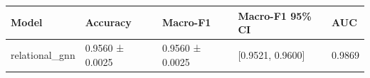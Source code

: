 \begin{tabular}{lllll}
\toprule
Model & Accuracy & Macro-F1 & Macro-F1 95\% CI & AUC \\
\midrule
relational\_gnn & 0.9560 ± 0.0025 & 0.9560 ± 0.0025 & [0.9521, 0.9600] & 0.9869 \\
\bottomrule
\end{tabular}
